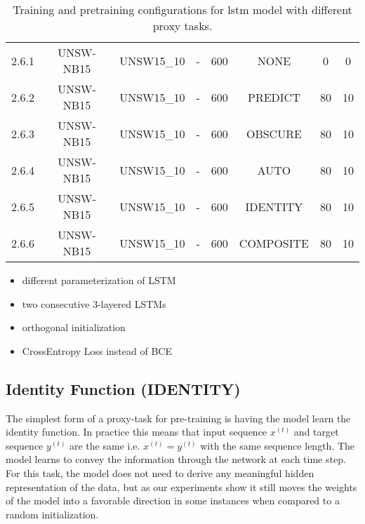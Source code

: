 \begin{table}[h]
{\begin{tabular}{cccccccc}
		2.6.1 \label{ex_2_6_1} & UNSW-NB15    & UNSW15\_10 & -           & 600           & NONE       & 0         & 0           \\
		2.6.2 \label{ex_2_6_2} & UNSW-NB15    & UNSW15\_10 & -           & 600           & PREDICT    & 80        & 10          \\
		2.6.3 \label{ex_2_6_3} & UNSW-NB15    & UNSW15\_10 & -           & 600           & OBSCURE      & 80        & 10          \\
		2.6.4 \label{ex_2_6_4} & UNSW-NB15    & UNSW15\_10 & -           & 600           & AUTO       & 80        & 10          \\
		2.6.5 \label{ex_2_6_5} & UNSW-NB15    & UNSW15\_10 & -           & 600           & IDENTITY   & 80        & 10          \\
		2.6.6 \label{ex_2_6_6} & UNSW-NB15    & UNSW15\_10 & -           & 600           & COMPOSITE  & 80        & 10         
	\end{tabular}}
	\caption{Training and pretraining configurations for \gls{lstm} model with different proxy tasks.}
	\label{table:experiments:lstm:configurations}
\end{table}

\begin{itemize}
	\item different parameterization of LSTM
	\item two consecutive 3-layered LSTMs
	\item orthogonal initialization
	\item CrossEntropy Loss instead of BCE
\end{itemize}

\subsection{Identity Function (IDENTITY)} \label{sec:experiments:lstm:identity}

The simplest form of a proxy-task for pre-training is having the model learn the identity function.
In practice this means that input sequence $x^{(t)}$ and target sequence $y^{(t)}$ are the same i.e. $x^{(t)} = y^{(t)}$ with the same sequence length. The model learns to convey the information through the network at each time step. For this task, the model does not need to derive any meaningful hidden representation of the data, but as our experiments show it still moves the weights of the model into a favorable direction in some instances when compared to a random initialization. 

